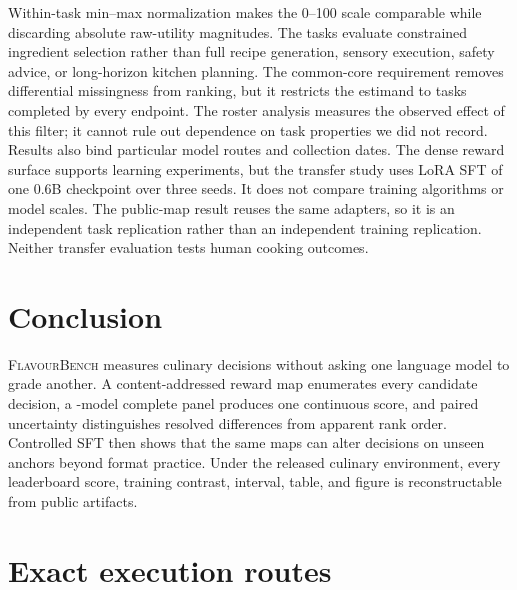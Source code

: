 \documentclass[10pt,twocolumn]{article}
\newcommand{\system}{\textsc{FlavourBench}}
\begin{document}
Within-task min--max normalization makes the 0--100 scale comparable while discarding absolute
raw-utility magnitudes. The tasks evaluate constrained ingredient selection rather than full recipe
generation, sensory execution, safety advice, or long-horizon kitchen planning. The common-core
requirement removes differential missingness from ranking, but it restricts the estimand to tasks
completed by every endpoint. The roster analysis measures the observed effect of this filter; it
cannot rule out dependence on task properties we did not record. Results also bind particular
model routes and collection dates. The dense reward surface supports learning experiments, but
the transfer study uses LoRA SFT of one 0.6B checkpoint over three seeds. It does not compare
training algorithms or model scales. The public-map result reuses the same adapters, so it is an
independent task replication rather than an independent training replication. Neither transfer
evaluation tests human cooking outcomes.

\section{Conclusion}

\system{} measures culinary decisions without asking one language model to grade another. A
content-addressed reward map enumerates every candidate decision, a \FBModels{}-model complete panel
produces one continuous score, and paired uncertainty distinguishes resolved differences from
apparent rank order. Controlled SFT then shows that the same maps can alter decisions on unseen
anchors beyond format practice. Under the released culinary environment, every leaderboard score,
training contrast, interval, table, and figure is reconstructable from public artifacts.




\clearpage
\onecolumn
\appendix
\section{Exact execution routes}
\label{app:routes}

\begin{center}
  \centering
  \scriptsize
  \setlength{\tabcolsep}{4pt}
  
\end{center}
\end{document}

